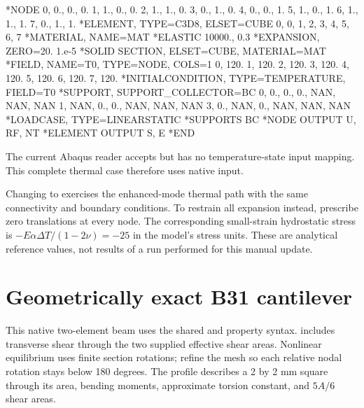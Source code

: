 \begin{dialectexamples}
\begin{femasterdeck}
*NODE
0, 0., 0., 0.
1, 1., 0., 0.
2, 1., 1., 0.
3, 0., 1., 0.
4, 0., 0., 1.
5, 1., 0., 1.
6, 1., 1., 1.
7, 0., 1., 1.
*ELEMENT, TYPE=C3D8, ELSET=CUBE
0, 0, 1, 2, 3, 4, 5, 6, 7
*MATERIAL, NAME=MAT
*ELASTIC
10000., 0.3
*EXPANSION, ZERO=20.
1.e-5
*SOLID SECTION, ELSET=CUBE, MATERIAL=MAT
*FIELD, NAME=T0, TYPE=NODE, COLS=1
0, 120.
1, 120.
2, 120.
3, 120.
4, 120.
5, 120.
6, 120.
7, 120.
*INITIALCONDITION, TYPE=TEMPERATURE, FIELD=T0
*SUPPORT, SUPPORT_COLLECTOR=BC
0, 0., 0., 0., NAN, NAN, NAN
1, NAN, 0., 0., NAN, NAN, NAN
3, 0., NAN, 0., NAN, NAN, NAN
*LOADCASE, TYPE=LINEARSTATIC
*SUPPORTS
BC
*NODE OUTPUT
U, RF, NT
*ELEMENT OUTPUT
S, E
*END
\end{femasterdeck}
\begin{noabaqus}
The current Abaqus reader accepts  but has no temperature-state input mapping. This complete thermal case therefore uses native input.
\end{noabaqus}
\end{dialectexamples}

Changing  to  exercises the enhanced-mode thermal path with the same connectivity and boundary conditions. To restrain all expansion instead, prescribe zero translations at every node. The corresponding small-strain hydrostatic stress is \(-E\alpha\Delta T/(1-2\nu)=-25\) in the model's stress units. These are analytical reference values, not results of a run performed for this manual update.

\section{Geometrically exact B31 cantilever}

This native two-element beam uses the shared  and  property syntax.  includes transverse shear through the two supplied effective shear areas. Nonlinear equilibrium uses finite section rotations; refine the mesh so each relative nodal rotation stays below 180 degrees. The profile describes a 2 by 2 mm square through its area, bending moments, approximate torsion constant, and \(5A/6\) shear areas.

